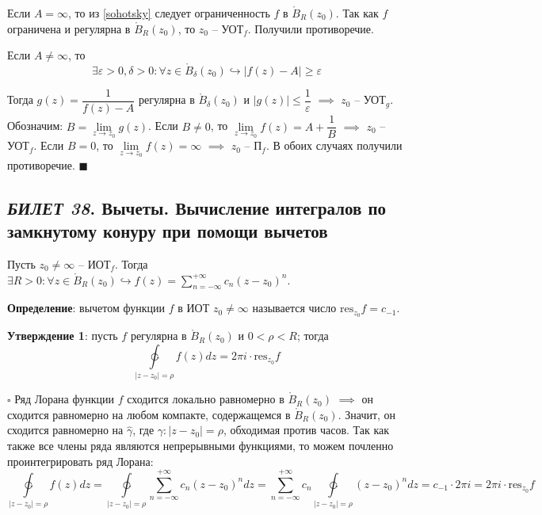 \documentclass[12pt, a4paper, reqno]{article}
\begin{document}
    Если $A = \infty$, то из \eqref{sohotsky} следует ограниченность $f$ в $\mathring B_R(z_0)$. Так
    как $f$ ограничена и регулярна в $\mathring B_R(z_0)$, то $z_0$ -- УОТ$_f$. Получили противоречие.

    Если $A \neq \infty$, то
    \begin{equation*}
        \exists \varepsilon > 0, \delta > 0: \forall z \in \mathring B_{\delta}(z_0) \hookrightarrow
        |f(z) - A| \geq \varepsilon
    \end{equation*}

    Тогда $g(z) = \dfrac{1}{f(z) - A}$ регулярна в $\mathring B_{\delta}(z_0)$ и
    $|g(z)| \leq \dfrac{1}{\varepsilon}$ $\implies$ $z_0$ -- УОТ$_g$. Обозначим:
    $B = \lim\limits_{z \to z_0} g(z)$. Если $B \neq 0$, то
    $\lim\limits_{z \to z_0} f(z) = A + \dfrac{1}{B}$ $\implies$ $z_0$ -- УОТ$_f$.
    Если $B = 0$, то $\lim\limits_{z \to z_0} f(z) = \infty$ $\implies$ $z_0$ -- П$_f$. В обоих
    случаях получили противоречие. $\blacksquare$

\newpage
\subsection{\textit{БИЛЕТ 38}. Вычеты. Вычисление интегралов по замкнутому конуру при помощи вычетов}

    Пусть $z_0 \neq \infty$ -- ИОТ$_f$. Тогда $\exists R > 0: \forall z \in \mathring B_R(z_0)
    \hookrightarrow f(z) = \sum\limits_{n = -\infty}^{+\infty} c_n (z - z_0)^n$.

    \textbf{Определение}: вычетом функции $f$ в ИОТ $z_0 \neq \infty$ называется число
    $\text{res}_{z_0} f = c_{-1}$.

    \textbf{Утверждение 1}: пусть $f$ регулярна в $\mathring B_R(z_0)$ и $0 < \rho < R$; тогда
    \begin{equation*}
        \ointctrclockwise\limits_{|z - z_0| = \rho} f(z)dz = 2\pi i \cdot \text{res}_{z_0} f
    \end{equation*}

    $\square$ Ряд Лорана функции $f$ сходится локально равномерно в $\mathring B_R(z_0)$ $\implies$
    он сходится равномерно на любом компакте, содержащемся в $\mathring B_R(z_0)$. Значит, он
    сходится равномерно на $\hat{\gamma}$, где $\gamma: |z - z_0| = \rho$, обходимая против часов.
    Так как также все члены ряда являются непрерывными функциями, то можем почленно проинтегрировать
    ряд Лорана:
    \begin{equation*}
        \ointctrclockwise\limits_{|z - z_0| = \rho} f(z)dz =
        \ointctrclockwise\limits_{|z - z_0| = \rho} \sum\limits_{n = -\infty}^{+\infty} c_n (z - z_0)^n dz =
        \sum\limits_{n = -\infty}^{+\infty} c_n \ointctrclockwise\limits_{|z - z_0| = \rho} (z - z_0)^n dz =
        c_{-1} \cdot 2\pi i = 2\pi i \cdot \text{res}_{z_0} f
    \end{equation*}
\end{document}
